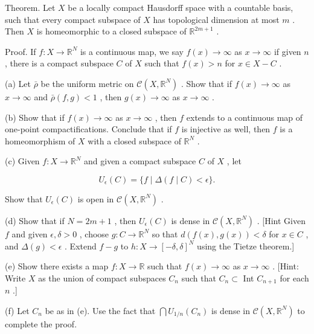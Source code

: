 Theorem. Let \(X\) be a locally compact Hausdorff space with a countable basis, such that every compact subspace of \(X\) has topological dimension at most \(m\) . Then \(X\) is homeomorphic to a closed subspace of \({\mathbb{R}}^{{2m} + 1}\) .

Proof. If \(f : X \rightarrow  {\mathbb{R}}^{N}\) is a continuous map, we say \(f\left( x\right)  \rightarrow  \infty\) as \(x \rightarrow  \infty\) if given \(n\) , there is a compact subspace \(C\) of \(X\) such that \(f\left( x\right)  > n\) for \(x \in  X - C\) .

(a) Let \(\bar{\rho }\) be the uniform metric on \(\mathcal{C}\left( {X,{\mathbb{R}}^{N}}\right)\) . Show that if \(f\left( x\right)  \rightarrow  \infty\) as \(x \rightarrow  \infty\) and \(\bar{\rho }\left( {f,g}\right)  < 1\) , then \(g\left( x\right)  \rightarrow  \infty\) as \(x \rightarrow  \infty\) .

(b) Show that if \(f\left( x\right)  \rightarrow  \infty\) as \(x \rightarrow  \infty\) , then \(f\) extends to a continuous map of one-point compactifications. Conclude that if \(f\) is injective as well, then \(f\) is a homeomorphism of \(X\) with a closed subspace of \({\mathbb{R}}^{N}\) .

(c) Given \(f : X \rightarrow  {\mathbb{R}}^{N}\) and given a compact subspace \(C\) of \(X\) , let

\[
{U}_{\epsilon }\left( C\right)  = \{ f \mid  \Delta \left( {f \mid  C}\right)  < \epsilon \} .
\]

Show that \({U}_{\epsilon }\left( C\right)\) is open in \(\mathcal{C}\left( {X,{\mathbb{R}}^{N}}\right)\) .

(d) Show that if \(N = {2m} + 1\) , then \({U}_{\epsilon }\left( C\right)\) is dense in \(\mathcal{C}\left( {X,{\mathbb{R}}^{N}}\right)\) . [Hint Given \(f\) and given \(\epsilon ,\delta  > 0\) , choose \(g : C \rightarrow  {\mathbb{R}}^{N}\) so that \(d\left( {f\left( x\right) ,g\left( x\right) }\right)  < \delta\) for \(x \in  C\) , and \(\Delta \left( g\right)  < \epsilon\) . Extend \(f - g\) to \(h : X \rightarrow  {\left\lbrack  -\delta ,\delta \right\rbrack  }^{N}\) using the Tietze theorem.]

(e) Show there exists a map \(f : X \rightarrow  \mathbb{R}\) such that \(f\left( x\right)  \rightarrow  \infty\) as \(x \rightarrow  \infty\) . [Hint: Write \(X\) as the union of compact subspaces \({C}_{n}\) such that \({C}_{n} \subset\) Int \({C}_{n + 1}\) for each \(n\) .]

(f) Let \({C}_{n}\) be as in (e). Use the fact that \(\bigcap {U}_{1/n}\left( {C}_{n}\right)\) is dense in \(\mathcal{C}\left( {X,{\mathbb{R}}^{N}}\right)\) to complete the proof.

